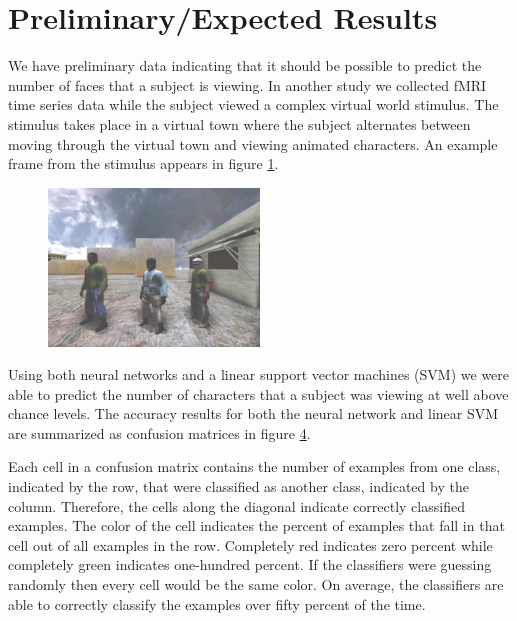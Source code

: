 \documentclass[12pt]{article}
\begin{document}
\section{Preliminary/Expected Results}
We have preliminary data indicating that it should be possible to predict the number of faces that a subject is viewing.
In another study we collected fMRI time series data while the subject viewed a complex virtual world stimulus.
The stimulus takes place in a virtual town where the subject alternates between moving through the virtual town and viewing animated characters.
An example frame from the stimulus appears in figure \ref{fig:preliminary-data-frame}.
\begin{figure}
\centering
\includegraphics[width=0.5\textwidth]{figures/preliminary-data-frame}
\cation{}
\label{fig:preliminary-data-frame}
\end{figure}
Using both neural networks and a linear support vector machines (SVM) we were able to predict the number of characters that a subject was viewing at well above chance levels.
The accuracy results for both the neural network and linear SVM are summarized as confusion matrices in figure \ref{fig:preliminary-data-confusion}.
\begin{figure}
\centering
\begin{subfigure}{\textwidth}
\centering

\caption{}
\label{fig:svm-confusion}
\end{subfigure}
\begin{subfigure}{\textwidth}
\centering

\caption{}
\label{fig:nn-confusion}
\end{subfigure}
\caption{}
\label{fig:preliminary-data-confusion}
\end{figure}
Each cell in a confusion matrix contains the number of examples from one class, indicated by the row, that were classified as another class, indicated by the column.
Therefore, the cells along the diagonal indicate correctly classified examples.
The color of the cell indicates the percent of examples that fall in that cell out of all examples in the row.
Completely red indicates zero percent while completely green indicates one-hundred percent.
If the classifiers were guessing randomly then every cell would be the same color.
On average, the classifiers are able to correctly classify the examples over fifty percent of the time.
\end{document}
